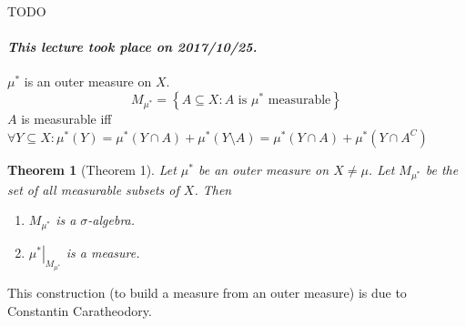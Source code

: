 \documentclass{article}
\newtheorem{theorem}{Theorem}  \numberwithin{theorem}{section}
\newcommand{\set}[1]{\left\{#1\right\}}
\newcommand{\dateref}[1]{\paragraph{\textit{This lecture took place on #1.}}}
\begin{document}
TODO

\dateref{2017/10/25}

$\mu^*$ is an outer measure on $X$.
\[ M_{\mu^*} = \set{A \subseteq X: A \text{ is } \mu^* \text{ measurable}} \]
$A$ is measurable iff $\forall Y \subseteq X: \mu^*(Y) = \mu^*(Y \cap A) + \mu^*(Y \setminus A) = \mu^*(Y \cap A) + \mu^*(Y \cap A^C)$


\begin{theorem}[Theorem 1]
  Let $\mu^*$ be an outer measure on $X \neq \mu$.
  Let $M_{\mu^*}$ be the set of all measurable subsets of $X$.
  Then
  \begin{enumerate}
    \item $M_{\mu^*}$ is a $\sigma$-algebra.
    \item $\left.\mu^*\right|_{M_{\mu^*}}$ is a measure.
  \end{enumerate}
\end{theorem}

This construction (to build a measure from an outer measure) is due to Constantin Caratheodory.
\end{document}

